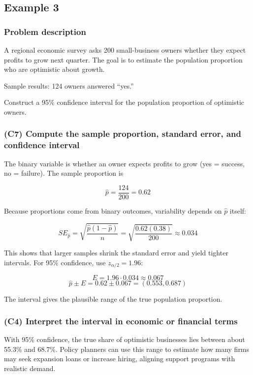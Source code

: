 \subsection{Example 3}\label{sec:interval-example2-1}

\subsubsection{Problem description}\label{subsec:interval-example2-1-problem}

A regional economic survey asks 200 small-business owners whether they expect profits to grow next quarter. The goal is to estimate the population proportion who are optimistic about growth.

Sample results: 124 owners answered ``yes.''

Construct a 95\% confidence interval for the population proportion of optimistic owners.


\subsubsection{(C7) Compute the sample proportion, standard error, and confidence interval}\label{subsubsec:interval-example2-1-c7}

The binary variable is whether an owner expects profits to grow (yes = success, no = failure). The sample proportion is

\[
\hat{p} = \frac{124}{200} = 0.62
\]

Because proportions come from binary outcomes, variability depends on \(\hat{p}\) itself:

\[
SE_{\hat{p}} = \sqrt{\frac{\hat{p}(1 - \hat{p})}{n}} = \sqrt{\frac{0.62(0.38)}{200}} \approx 0.034
\]

This shows that larger samples shrink the standard error and yield tighter intervals. For 95\% confidence, use \(z_{\alpha/2} = 1.96\):

\[
E = 1.96 \cdot 0.034 \approx 0.067
\]
\[
\hat{p} \pm E = 0.62 \pm 0.067 = (0.553, 0.687)
\]

The interval gives the plausible range of the true population proportion.

\subsubsection{(C4) Interpret the interval in economic or financial terms}\label{subsubsec:interval-example2-1-c4}

With 95\% confidence, the true share of optimistic businesses lies between about 55.3\% and 68.7\%. Policy planners can use this range to estimate how many firms may seek expansion loans or increase hiring, aligning support programs with realistic demand.

